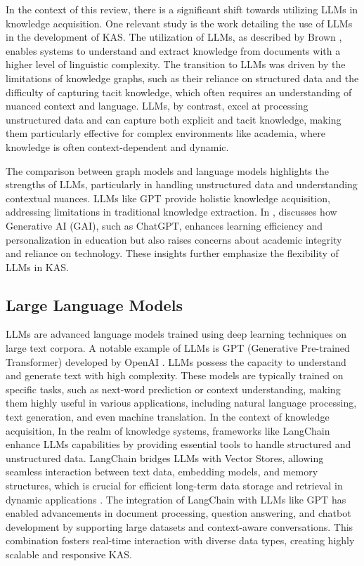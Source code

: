 \documentclass[runningheads]{llncs}
\begin{document}
In the context of this review, there is a significant shift towards utilizing LLMs in knowledge acquisition. One relevant study is the work detailing the use of LLMs in the development of KAS. The utilization of LLMs, as described by Brown \cite{Brown2020}, enables systems to understand and extract knowledge from documents with a higher level of linguistic complexity. The transition to LLMs was driven by the limitations of knowledge graphs, such as their reliance on structured data and the difficulty of capturing tacit knowledge, which often requires an understanding of nuanced context and language. LLMs, by contrast, excel at processing unstructured data and can capture both explicit and tacit knowledge, making them particularly effective for complex environments like academia, where knowledge is often context-dependent and dynamic.

The comparison between graph models and language models highlights the strengths of LLMs, particularly in handling unstructured data and understanding contextual nuances. LLMs like GPT provide holistic knowledge acquisition, addressing limitations in traditional knowledge extraction. In \cite{Krause2024}, discusses how Generative AI (GAI), such as ChatGPT, enhances learning efficiency and personalization in education but also raises concerns about academic integrity and reliance on technology. These insights further emphasize the flexibility of LLMs in KAS.

\subsection{Large Language Models}
LLMs are advanced language models trained using deep learning techniques on large text corpora. A notable example of LLMs is GPT (Generative Pre-trained Transformer) developed by OpenAI \cite{Brown2020}. LLMs possess the capacity to understand and generate text with high complexity. These models are typically trained on specific tasks, such as next-word prediction or context understanding, making them highly useful in various applications, including natural language processing, text generation, and even machine translation. In the context of knowledge acquisition, In the realm of knowledge systems, frameworks like LangChain enhance LLMs capabilities by providing essential tools to handle structured and unstructured data. LangChain bridges LLMs with Vector Stores, allowing seamless interaction between text data, embedding models, and memory structures, which is crucial for efficient long-term data storage and retrieval in dynamic applications \cite{deepLearning2023LangChain}. The integration of LangChain with LLMs like GPT has enabled advancements in document processing, question answering, and chatbot development by supporting large datasets and context-aware conversations. This combination fosters real-time interaction with diverse data types, creating highly scalable and responsive KAS.
\end{document}
